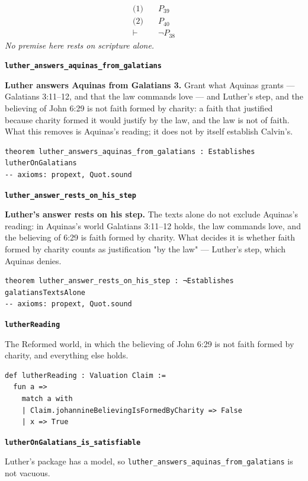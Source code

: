 \documentclass[11pt]{article}
\begin{document}
\begin{align*}
  \text{(1)} \quad & P_{39} \\
  \text{(2)} \quad & P_{40} \\
  \vdash \quad & \lnot P_{38}
\end{align*}
\emph{No premise here rests on scripture alone.}
\par\medskip\noindent\textbf{\texttt{luther\_\allowbreak{}answers\_\allowbreak{}aquinas\_\allowbreak{}from\_\allowbreak{}galatians}}\par\nobreak\noindent
\textbf{Luther answers Aquinas from Galatians 3.} Grant what Aquinas grants — Galatians 3:11–12, and that the law commands love — and Luther's step, and the believing of John 6:29 is not faith formed by charity: a faith that justified because charity formed it would justify by the law, and the law is not of faith. What this removes is Aquinas's reading; it does not by itself establish Calvin's.

{\small\begin{verbatim}
theorem luther_answers_aquinas_from_galatians : Establishes lutherOnGalatians
-- axioms: propext, Quot.sound
\end{verbatim}}
\par\medskip\noindent\textbf{\texttt{luther\_\allowbreak{}answer\_\allowbreak{}rests\_\allowbreak{}on\_\allowbreak{}his\_\allowbreak{}step}}\par\nobreak\noindent
\textbf{Luther's answer rests on his step.} The texts alone do not exclude Aquinas's reading: in Aquinas's world Galatians 3:11–12 holds, the law commands love, and the believing of 6:29 is faith formed by charity. What decides it is whether faith formed by charity counts as justification "by the law" — Luther's step, which Aquinas denies.

{\small\begin{verbatim}
theorem luther_answer_rests_on_his_step : ¬Establishes galatiansTextsAlone
-- axioms: propext, Quot.sound
\end{verbatim}}
\par\medskip\noindent\textbf{\texttt{luther\allowbreak{}Reading}}\par\nobreak\noindent
The Reformed world, in which the believing of John 6:29 is not faith formed by charity, and everything else holds.

{\small\begin{verbatim}
def lutherReading : Valuation Claim :=
  fun a =>
    match a with
    | Claim.johannineBelievingIsFormedByCharity => False
    | x => True
\end{verbatim}}
\par\medskip\noindent\textbf{\texttt{luther\allowbreak{}On\allowbreak{}Galatians\_\allowbreak{}is\_\allowbreak{}satisfiable}}\par\nobreak\noindent
Luther's package has a model, so \texttt{luther\_\allowbreak{}answers\_\allowbreak{}aquinas\_\allowbreak{}from\_\allowbreak{}galatians} is not vacuous.
\end{document}
